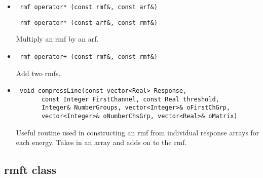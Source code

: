 \documentclass[11pt]{book}
\begin{document}
\begin{itemize}

\item  \begin{verbatim} rmf operator* (const rmf&, const arf&) \end{verbatim}
       \begin{verbatim} rmf operator* (const arf&, const rmf&) \end{verbatim}

          Multiply an rmf by an arf.

\item  \begin{verbatim} rmf operator+ (const rmf&, const rmf&) \end{verbatim}

          Add two rmfs.

\item  \begin{verbatim} void compressLine(const vector<Real> Response,
       const Integer FirstChannel, const Real threshold, 
       Integer& NumberGroups, vector<Integer>& oFirstChGrp, 
       vector<Integer>& oNumberChsGrp, vector<Real>& oMatrix) \end{verbatim}

          Useful routine used in constructing an rmf from individual
          response arrays for each energy. Takes in an array and adds
          on to the rmf.

\end{itemize}

\subsection{rmft class}
\end{document}
